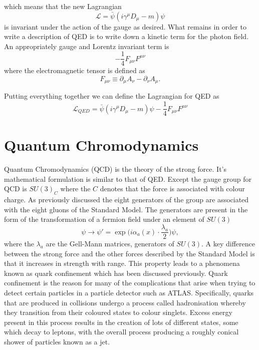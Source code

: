 which means that the new Lagrangian
\begin{equation}
  \label{eq:dirac-cov}
  \mathcal{L} = \bar{\psi}(i\gamma^{\mu}D_{\mu} - m)\psi
\end{equation}
is invariant under the action of the gauge as desired. What remains in order to
write a description of QED is to write down a kinetic term for the photon field.
An appropriately gauge and Lorentz invariant term is
\begin{equation}
  \label{eq:em-kinetic}
  -\frac{1}{4}F_{\mu\nu}F^{\mu\nu}
\end{equation}
where the electromagnetic tensor is defined as
\begin{equation}
  \label{eq:em-tensor}
  F_{\mu\nu} \equiv \partial_{\mu}A_{\nu} - \partial_{\nu}A_{\mu}.
\end{equation}

Putting everything together we can define the Lagrangian for QED as
\begin{equation}
  \label{eq:qed}
  \mathcal{L}_{QED} =
  \bar{\psi}(i\gamma^{\mu}D_{\mu} - m)\psi -\frac{1}{4}F_{\mu\nu}F^{\mu\nu} 
\end{equation}

\section{Quantum Chromodynamics}

Quantum Chromodynamics (QCD) is the theory of the strong force. It's mathematical
formulation is similar to that of QED. Except the gauge group for QCD is
$SU(3)_C$ where the $C$ denotes that the force is associated with colour charge.
As previously discussed the eight generators of the group are associated with
the eight gluons of the Standard Model. The generators are present in the form
of the transformation of a fermion field under an element of $SU(3)$
\begin{equation}
  \label{eq:su3-trans}
  \psi \rightarrow \psi' =
  \exp\Big({i\alpha_{a}(x)\cdot\frac{\lambda_{a}}{2}}\Big)\psi,
\end{equation}
where the $\lambda_a$ are the Gell-Mann matrices, generators of $SU(3)$.
A key difference between the strong force and the other forces described by
the Standard Model is that it increases in strength with range. This property
leads to a phenomena known as quark confinement which has been discussed
previously. Quark confinement is the reason for many of the complications that
arise when trying to detect certain particles in a particle detector such as
ATLAS. Specifically, quarks that are produced in collisions undergo a process
called hadronisation whereby they transition from their coloured states to
colour singlets. Excess energy present in this process results in the creation
of lots of different states, some which decay to leptons, with the overall
process producing a roughly conical shower of particles known as a jet.

